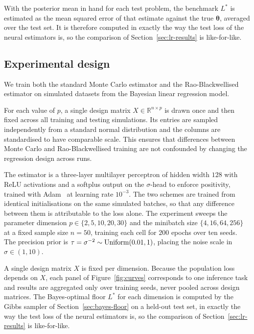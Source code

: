 With the posterior mean in hand for each test problem, the benchmark
$L^{*}$ is estimated as the mean squared error of that estimate
against the true $\bm{\theta}$, averaged over the test set. It is
therefore computed in exactly the way the test loss of the neural
estimators is, so the comparison of Section~\ref{sec:lr-results} is
like-for-like.

\subsection{Experimental design}
\label{sec:lr-design}

We train both the standard Monte Carlo estimator and the Rao-Blackwellised estimator
on simulated datasets from the Bayesian linear regression model.

For each value of $p$, a single design matrix $X \in \mathbb{R}^{n \times p}$ is drawn once 
and then fixed across all training and testing simulations. Its entries are sampled independently 
from a standard normal distribution and the columns are standardised to have comparable 
scale. This ensures that differences between Monte Carlo and Rao-Blackwellised training are 
not confounded by changing the regression design across runs.

The estimator is a three-layer multilayer perceptron of hidden width
$128$ with ReLU activations and a softplus output on the $\sigma$-head
to enforce positivity, trained with Adam~\citep{kingma2015adam} at
learning rate $10^{-3}$. The two schemes are trained from identical
initialisations on the same simulated batches, so that any difference
between them is attributable to the loss alone. The experiment sweeps
the parameter dimension $p \in \{2, 5, 10, 20, 30\}$ and the minibatch
size $\{4, 16, 64, 256\}$ at a fixed sample size $n = 50$, training
each cell for $200$ epochs over ten seeds. The precision prior is
$\tau = \sigma^{-2} \sim \mathrm{Uniform}(0.01, 1)$, placing the noise scale in
$\sigma \in (1, 10)$.

A single design matrix $X$ is fixed per dimension. Because the
population loss depends on $X$, each panel of
Figure~\ref{fig:curves} corresponds to one inference task and results
are aggregated only over training seeds, never pooled across design
matrices. The Bayes-optimal floor $L^{*}$ for each dimension is
computed by the Gibbs sampler of Section~\ref{sec:bayes-floor} on a
held-out test set, in exactly the way the test loss of the neural
estimators is, so the comparison of Section~\ref{sec:lr-results} is
like-for-like.

